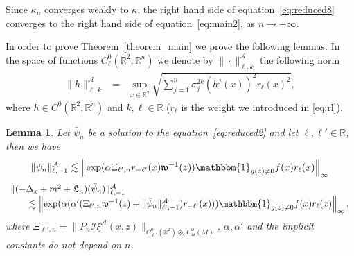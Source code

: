 \documentclass[a4paper,10pt]{article}
\newcommand{\nobracket}{}
\newtheorem{lemma}[theorem]{Lemma}
\begin{document}
\begin{remark}
  Since $\kappa_n$ converges weakly to $\kappa$, the right hand side of
  equation~{\eqref{eq:reduced8}} converges to the right hand side of
  equation~{\eqref{eq:main2}}, as $n \rightarrow + \infty$. 
\end{remark}

In order to prove Theorem~\ref{theorem_main} we prove the following lemmas. In
the space of functions $C^0_{\ell} (\mathbb{R}^2, \mathbb{R}^n)$ we denote by
$\| \cdot \|^{\mathcal{A}}_{\ell, k}$ the following norm
\begin{eqnarray}
  \| h \|^{\mathcal{A}}_{\ell, k} & = & \sup_{x \in \mathbb{R}^2}
  \sqrt{\sum_{j = 1}^n \sigma_j^{2 k} (h^j (x))^2 r_{\ell} (x)^2}, \nonumber
\end{eqnarray}
where $h \in C^0 (\mathbb{R}^2, \mathbb{R}^n)$ and $k, \ell \in \mathbb{R}$
($r_{\ell}$ is the weight we introduced in {\eqref{eq:rl}}).

\begin{lemma}
  \label{lemma_reduced1}Let $\bar{\psi}_n$ be a solution to the
  equation~{\eqref{eq:reduced2}} and let $\ell, \ell' \in \mathbb{R}$, then we
  have
  \begin{equation}
    \| \bar{\psi}_n \|^{\mathcal{A}}_{\ell, - 1} \lesssim \left\| \exp (\alpha
    \Xi_{\ell', n} r_{- \ell'} (x) \mathfrak{w}^{- 1} (z)) \mathbbm{1}_{g (z)
    \not{=} 0} f (x) r_{\ell} (x) \right\|_{\infty} \label{eq:inequality1}
  \end{equation}
  \begin{equation}
    \begin{array}{l}
      \| (- \Delta_x + m^2 + \mathfrak{L}_n) (\bar{\psi}_n)
      \|^{\mathcal{A}}_{\ell, - 1}\\
      \qquad \lesssim \left\| \exp (\alpha (\alpha' (\Xi_{\ell', n}
      \mathfrak{w}^{- 1} (z) + \| \bar{\psi}_n \|^{\mathcal{A}}_{\ell', - 1})
      r_{- \ell'} (x))) \mathbbm{1}_{g (z) \not{=} 0} f (x) r_{\ell} (x)
      \right\|_{\infty},
    \end{array} \label{eq:inequality2}
  \end{equation}
  where $\Xi_{\ell', n} = \| P_n \mathcal{I} \xi^{\mathcal{A}} (x, z)
  \|_{\nobracket C^0_{\ell'} (\mathbb{R}^2 \nobracket) \otimes_{\epsilon}
  C^0_{\mathfrak{w}} (M)}$, $\alpha, \alpha'$ and the implicit constants do
  not depend on $n$.
\end{lemma}
\end{document}
